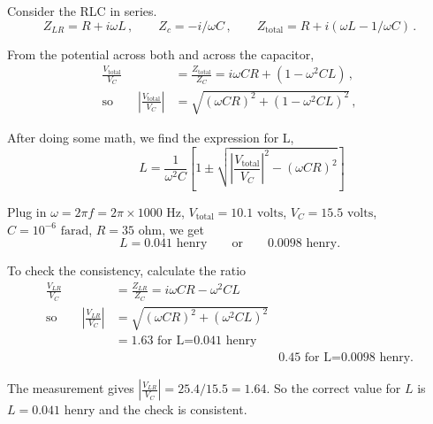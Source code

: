 \documentclass[makesolutionspdf]{esg8022pset}
\begin{document}
\begin{solution}
  Consider the RLC in series.  
  \begin{equation}
  Z_{LR}=R+i\omega L\,,\qquad Z_c=-i/\omega C\,,\qquad
  Z_{\text{total}}=R+i(\omega L-1/\omega C)\,.
  \end{equation}

  From the potential across both and across the capacitor,
  \begin{align}
  \frac{V_{\text{total}}}{V_C}& =\frac{Z_{\text{total}}}{Z_C}=i\omega
  CR+(1-\omega^2 CL)\,,\\
  \text{so}\qquad \left| \frac{V_{\text{total}}}{V_C}\right| & =
  \sqrt{(\omega CR)^2+(1-\omega^2 CL)^2}\,,
  \end{align}

  After doing some math, we find the expression for L,
  \begin{equation}
  \qquad L = \frac{1}{\omega^2 C}\left[
  1\pm \sqrt{\left|\frac{V_{\text{total}}}{V_C}\right|^2-(\omega CR)^2}
  \right]
  \end{equation}

  Plug in $\omega=2\pi f=2\pi\times 1000\text{ Hz}$,
  $V_{\text{total}}=10.1\text{ volts}$, $V_C=15.5\text{ volts}$,
  $C=10^{-6}\text{ farad}$, $R=35\text{ ohm}$, we get
  \[ L= 0.041 \text{ henry}\qquad\text{or}\qquad 0.0098\text{ henry}.\]

  To check the consistency, calculate the ratio
  \begin{align}
  \frac{V_{LR}}{V_C}& =\frac{Z_{LR}}{Z_C}=i\omega CR-\omega^2 CL\\
  \text{so}\qquad \left|\frac{V_{LR}}{V_C}\right| & = \sqrt{(\omega
  CR)^2+(\omega^2 CL)^2}\\
  & = 1.63 \text{ for L=0.041 henry}\nonumber\\
  & & 0.45\text{ for L=0.0098 henry}.
  \end{align}

  The measurement gives $\left|\frac{V_{LR}}{V_C}\right| =
  25.4/15.5=1.64$.  So the correct value for $L$ is $L=0.041$ henry and the
  check is consistent.
\end{solution}
\end{document}
